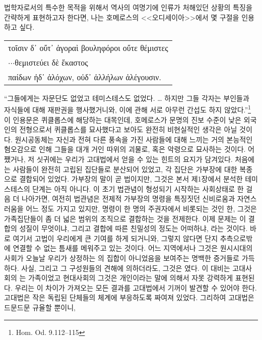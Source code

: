 법학자로서의 특수한 목적을 위해서
역사의 여명기에 인류가 처해있던 상황의 특징을 간략하게 표현하고자 한다면,
나는 \hypertarget{cyclops}{호메로스}의 <<오디세이아>>에서 몇 구절을 인용하고 싶다.
\begin{center}
  \greekfont\latinmarks
  \begin{tabular}{l}
    τοῖσιν δ᾽ οὔτ᾽ ἀγοραὶ βουληφόροι οὔτε θέμιστες\rlap{.}\\
    \hfill$\cdot$\hfill$\cdot$\hfill$\cdot$\hfill θεμιστεύει δὲ ἕκαστος\\
    παίδων ἠδ᾽ ἀλόχων, οὐδ᾽ ἀλλήλων ἀλέγουσιν.
  \end{tabular}
\end{center}
``그들에게는 자문단도 없었고 테미스테스도 없었다. \ldots{}
하지만 그들 각자는 부인들과 자식들에 대해 재판권을 행사했거니와,
이에 관해 서로 아무런 간섭도 하지 않았다.''\footnote{Hom. Od. 9.112--115}
이 인용문은 퀴클롭스에 해당하는 대목인데,
호메로스가
문명의 진보 수준이 낮은 외국인의 전형으로서
퀴클롭스를
묘사했다고 보아도 완전히 비현실적인 생각은 아닐 것이다.
원시공동체는 자신과 전혀 다른 풍속을 가진 사람들에 대해 느끼는
거의 본능적인 혐오감으로 인해 그들을 대개 거인 따위의 괴물로,
혹은  악령으로
묘사하는 것이다.
어쨌거나, 저 싯귀에는 우리가 고대법에서 얻을 수 있는 힌트의 요지가 담겨있다.
처음에는 사람들이 완전히 고립된 집단들로 분산되어 있었고,
각 집단은 가부장에 대한 복종으로 결합되어 있었다.
가부장의 말이 곧 법이지만, 그것은 본서 제1장에서 분석한
테미스테스의 단계는 아직 아니다.
이 초기 법관념이 형성되기 시작하는 사회상태로 한 걸음 더 나아가면,
여전히
법관념은 전제적 가부장의 명령을 특징짓던 신비로움과 자연스러움을
어느 정도 가지고 있지만,
명령이 한 명의 주권자에서 비롯되는 것인 한,
그것은 가족집단들이 좀 더 넓은 범위의 조직으로 결합하는 것을
전제한다.
이제 문제는 이 결합의 성질이 무엇이냐, 그리고
결합에 따른 친밀성의 정도는 어떠하냐, 라는 것이다.
바로 여기서 고법이 우리에게 큰 기여를 하게 되거니와,
그렇지 않다면 단지 추측으로밖에 연결할 수 없는 틈새를 메워주고 있는 것이다.
어느 지역에서나 그것은 원시시대의 사회가 오늘날 우리가 상정하는
의 집합이 아니었음을 보여주는 명백한 증거들로 가득하다.
사실, 그리고 그 구성원들의 견해에 의하더라도,
그것은 였다.
이 대비는
고대사회의 는 가족이었고
현대사회의 그것은 개인이라는 말에 의해서
자못 강력하게 표현된다.
우리는 이 차이가 가져오는 모든 결과를 고대법에서 기꺼이 발견할 수 있어야 한다.
고대법은 작은 독립된 단체들의 체계에 부응하도록 짜여져 있었다.
그리하여 고대법은 드문드문 규율할 뿐이니,
